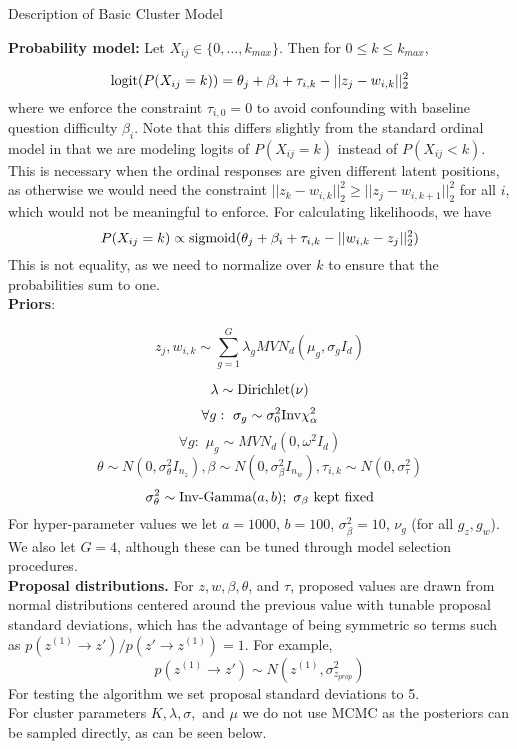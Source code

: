 \documentclass[12pt]{article}
\newcommand{\tx}[1]{\textnormal{#1}}
\begin{document}
	
	\begin{center}
		Description of Basic Cluster Model
	\end{center}
	
\textbf{Probability model:} Let $X_{ij}\in\{0,\dots,k_{max}\}$. Then for $0\leq k\leq k_{max}$,

$$\tx{logit}(P(X_{ij}=k))=\theta_j+\beta_i+\tau_{i,k}-||{z}_j-w_{i,k}||_2^2$$ where we enforce the constraint $\tau_{i,0}=0$ to avoid confounding with baseline question difficulty $\beta_i$. Note that this differs slightly from the standard ordinal model in that we are modeling logits of $P(X_{ij}=k)$ instead of $P(X_{ij}<k)$. This is necessary when the ordinal responses are given different latent positions, as otherwise we would need the constraint $||{z}_k-{w}_{i,k}||_2^2\geq ||z_j-{w}_{i,k+1}||_2^2$ for all $i$, which would not be meaningful to enforce.  For calculating likelihoods, we have $$P(X_{ij}=k)\propto\tx{sigmoid}(\theta_j+\beta_i+\tau_{i,k}-||{w}_{i,k}-{z}_j||_2^2)$$ This is not equality, as we need to normalize over $k$ to ensure that the probabilities sum to one. \\


\textbf{Priors}:

$$z_j,w_{i,k}\sim\sum_{g=1}^{G}\lambda_{g}MVN_d(\mu_{g},\sigma_{g}I_d)$$



$$\lambda\sim \tx{Dirichlet}(\nu)$$ $$\forall g:\,\,\sigma_{g}\sim \sigma_0^2\tx{Inv}\chi_\alpha^2$$ $$\forall g:\,\,\mu_{g}\sim MVN_d(0,\omega^2I_d)$$
$$\theta\sim N(0,\sigma_\theta^2I_{n_z}),\beta\sim N(0,\sigma_\beta^2 I_{n_w}),\tau_{i,k}\sim N(0,\sigma_\tau^2)$$
$$\sigma_\theta^2\sim \tx{Inv-Gamma}(a,b);\tx{  }\sigma_\beta\tx{ kept fixed}$$
 For hyper-parameter values we let $a=1000$, $b=100$, $\sigma_\beta^2=10$, $\nu_{g}$ (for all $g_z,g_w$). We also let $G=4$, although these can be tuned through model selection procedures. \\

\textbf{Proposal distributions.} For $z,w,\beta,\theta$, and $\tau$, proposed values are drawn from normal distributions centered around the previous value with tunable proposal standard deviations, which has the advantage of being symmetric so terms such as $p(z^{(1)}\rightarrow z')/p(z'\rightarrow z^{(1)})=1$. For example, $$p(z^{(1)}\rightarrow z')\sim N(z^{(1)},\sigma^2_{z_{prop}})$$ For testing the algorithm we set proposal standard deviations to 5.\\

For cluster parameters $K,\lambda,\sigma,$ and $\mu$ we do not use MCMC as the posteriors can be sampled directly, as can be seen below.\\
\end{document}
